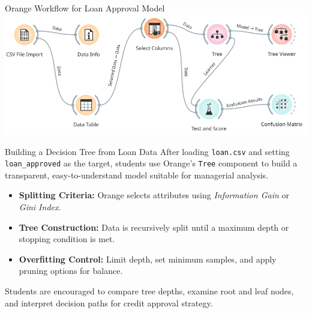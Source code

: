 \documentclass[aspectratio=169, table]{beamer}
\begin{document}
\begin{frame}{Orange Workflow for Loan Approval Model}
	\vspace{10pt}
	\centering
	\includegraphics[width=\linewidth]{../../figures/decision_tree_pipeline.png}
\end{frame}


\begin{frame}{Building a Decision Tree from Loan Data}
	\vspace{10pt}
	After loading \texttt{loan.csv} and setting \texttt{loan\_approved} as the target, students use Orange’s \texttt{Tree} component to build a transparent, easy-to-understand model suitable for managerial analysis.
	
	\begin{itemize}
		\item \textbf{Splitting Criteria:} Orange selects attributes using \textit{Information Gain} or \textit{Gini Index}.
		\item \textbf{Tree Construction:} Data is recursively split until a maximum depth or stopping condition is met.
		\item \textbf{Overfitting Control:} Limit depth, set minimum samples, and apply pruning options for balance.
	\end{itemize}
	
	Students are encouraged to compare tree depths, examine root and leaf nodes, and interpret decision paths for credit approval strategy.
\end{frame}
\end{document}
